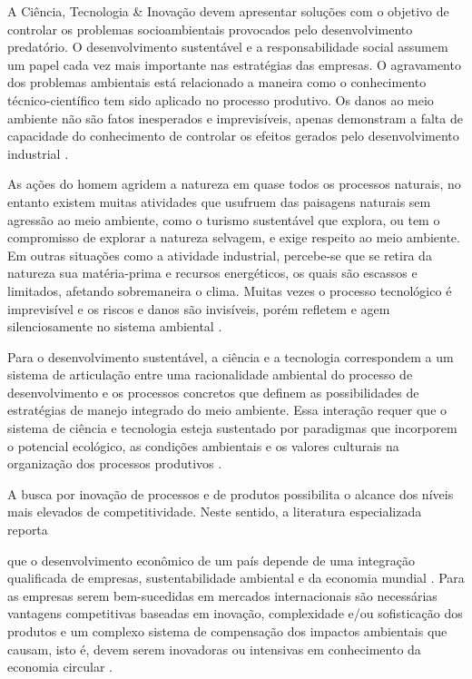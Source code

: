 A Ciência, Tecnologia \& Inovação devem apresentar soluções com o objetivo de controlar os problemas socioambientais provocados pelo desenvolvimento predatório. O desenvolvimento sustentável e a responsabilidade social assumem um papel cada vez mais importante nas estratégias das empresas. O agravamento dos problemas ambientais está relacionado a maneira como o conhecimento técnico-científico tem sido aplicado no processo produtivo. Os danos ao meio ambiente não são fatos inesperados e imprevisíveis, apenas demonstram a falta de capacidade do conhecimento de controlar os efeitos gerados pelo desenvolvimento industrial \cite{maranhao_dinamica_2016}.

As ações do homem agridem a natureza em quase todos os processos naturais, no entanto existem muitas atividades que usufruem das paisagens naturais sem agressão ao meio ambiente, como o turismo sustentável que explora, ou tem o compromisso de explorar a natureza selvagem, e exige respeito ao meio ambiente. Em outras situações como a atividade industrial, percebe-se que se retira da natureza sua matéria-prima e recursos energéticos, os quais são escassos e limitados, afetando sobremaneira o clima. Muitas vezes o processo tecnológico é imprevisível e os riscos e danos são invisíveis, porém refletem e agem silenciosamente no sistema ambiental \cite{marques_natureza_2017}.

Para o desenvolvimento sustentável, a ciência e a tecnologia correspondem a um sistema de articulação entre uma racionalidade ambiental do processo de desenvolvimento e os processos concretos que definem as possibilidades de estratégias de manejo integrado do meio ambiente. Essa interação requer que o sistema de ciência e tecnologia esteja sustentado por paradigmas que incorporem o potencial ecológico, as condições ambientais e os valores culturais na organização dos processos produtivos \cite{furlan_gestao_2018}.

A busca por inovação de processos e de produtos possibilita o alcance dos níveis mais elevados de competitividade. Neste sentido, a literatura especializada reporta 

 que o desenvolvimento econômico de um país depende de uma integração qualificada de empresas, sustentabilidade ambiental e da economia mundial \cite{swinburn_desenvolvimento_2006}
. Para as empresas serem bem-sucedidas em mercados internacionais são necessárias vantagens competitivas baseadas em inovação, complexidade e/ou sofisticação dos produtos e um complexo sistema de compensação dos impactos ambientais que causam, isto é, devem serem inovadoras ou intensivas em conhecimento da economia circular \cite{lucas_desenvolvimento_2019}.



